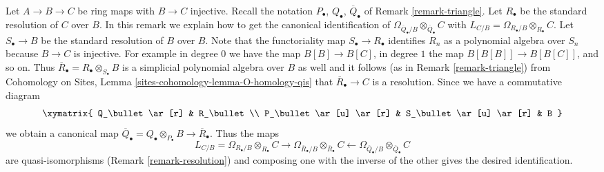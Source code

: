 \begin{remark}
\label{remark-explicit-map}
Let $A \to B \to C$ be ring maps with $B \to C$ injective.
Recall the notation $P_\bullet$, $Q_\bullet$, $\overline{Q}_\bullet$ of
Remark \ref{remark-triangle}.
Let $R_\bullet$ be the standard resolution of $C$ over $B$.
In this remark we explain how to get the canonical identification
of $\Omega_{\overline{Q}_\bullet/B} \otimes_{\overline{Q}_\bullet} C$
with $L_{C/B} = \Omega_{R_\bullet/B} \otimes_{R_\bullet} C$.
Let $S_\bullet \to B$ be the standard resolution of $B$ over $B$.
Note that the functoriality map $S_\bullet \to R_\bullet$ identifies
$R_n$ as a polynomial algebra over $S_n$ because $B \to C$ is injective.
For example in degree $0$ we have the map $B[B] \to B[C]$, in degree
$1$ the map $B[B[B]] \to B[B[C]]$, and so on. Thus
$\overline{R}_\bullet = R_\bullet \otimes_{S_\bullet} B$
is a simplicial polynomial algebra
over $B$ as well and it follows (as in Remark \ref{remark-triangle}) from
Cohomology on Sites, Lemma
\ref{sites-cohomology-lemma-O-homology-qis}
that $\overline{R}_\bullet \to C$ is a resolution. Since we have
a commutative diagram
$$
\xymatrix{
Q_\bullet \ar[r] & R_\bullet \\
P_\bullet \ar[u] \ar[r] & S_\bullet \ar[u] \ar[r] & B
}
$$
we obtain a canonical map
$\overline{Q}_\bullet = Q_\bullet \otimes_{P_\bullet} B \to
\overline{R}_\bullet$. Thus the maps
$$
L_{C/B} = \Omega_{R_\bullet/B} \otimes_{R_\bullet} C
\longrightarrow
\Omega_{\overline{R}_\bullet/B} \otimes_{\overline{R}_\bullet} C
\longleftarrow
\Omega_{\overline{Q}_\bullet/B} \otimes_{\overline{Q}_\bullet} C
$$
are quasi-isomorphisms (Remark \ref{remark-resolution}) and composing
one with the inverse of the other gives the desired identification.
\end{remark}